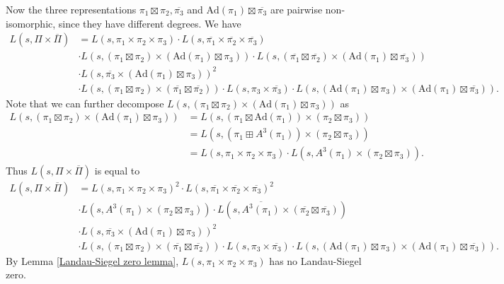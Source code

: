\documentclass[12pt]{amsart}
\newcommand{\Ad}{\text{Ad}}
\newcommand{\ov}{\overline}
\begin{document}
Now the three representations $\pi_1 \boxtimes \pi_2, \ov{\pi_3}$ and $\Ad(\pi_1) \boxtimes \ov{\pi_3}$ are pairwise non-isomorphic, since they have different degrees. We have
\begin{align*}
    L(s,\Pi \times \ov{\Pi}) &= L(s,\pi_1 \times \pi_2 \times \pi_3) \cdot L(s,\ov{\pi_1} \times \ov{\pi_2} \times \ov{\pi_3}) \\
    &\cdot L(s,(\pi_1 \boxtimes \pi_2) \times (\Ad(\pi_1) \boxtimes \pi_3)) \cdot L(s,(\ov{\pi_1} \boxtimes \ov{\pi_2}) \times (\Ad(\pi_1) \boxtimes \ov{\pi_3})) \\
    &\cdot L(s,\ov{\pi_3} \times (\Ad(\pi_1) \boxtimes \pi_3))^2 \\
    &\cdot L(s, (\pi_1 \boxtimes \pi_2) \times (\ov{\pi_1} \boxtimes \ov{\pi_2})) \cdot L(s,\pi_3 \times \ov{\pi_3}) \cdot L(s,(\Ad(\pi_1) \boxtimes \pi_3) \times (\Ad(\pi_1) \boxtimes \ov{\pi_3})).
\end{align*}
Note that we can further decompose $L(s,(\pi_1 \boxtimes \pi_2) \times (\Ad(\pi_1) \boxtimes \pi_3))$ as 
\begin{align*}
    L(s,(\pi_1 \boxtimes \pi_2) \times (\Ad(\pi_1) \boxtimes \pi_3)) &= L(s,(\pi_1 \boxtimes \Ad(\pi_1)) \times (\pi_2 \boxtimes \pi_3)) \\
    &= L(s,(\pi_1 \boxplus A^3(\pi_1)) \times (\pi_2 \boxtimes \pi_3)) \\
    &= L(s,\pi_1 \times \pi_2 \times \pi_3) \cdot L(s,A^3(\pi_1) \times (\pi_2 \boxtimes \pi_3)).
\end{align*}
Thus $L(s,\Pi \times \ov{\Pi})$ is equal to 
\begin{align*}
    L(s,\Pi \times \ov{\Pi}) &= L(s,\pi_1 \times \pi_2 \times \pi_3)^2 \cdot L(s,\ov{\pi_1} \times \ov{\pi_2} \times \ov{\pi_3})^2 \\
    &\cdot L(s,A^3(\pi_1) \times (\pi_2 \boxtimes \pi_3)) \cdot L(s,\ov{A^3(\pi_1)} \times (\ov{\pi_2} \boxtimes \ov{\pi_3})) \\
    &\cdot L(s,\ov{\pi_3} \times (\Ad(\pi_1) \boxtimes \pi_3))^2 \\
    &\cdot L(s, (\pi_1 \boxtimes \pi_2) \times (\ov{\pi_1} \boxtimes \ov{\pi_2})) \cdot L(s,\pi_3 \times \ov{\pi_3}) \cdot L(s,(\Ad(\pi_1) \boxtimes \pi_3) \times (\Ad(\pi_1) \boxtimes \ov{\pi_3})).
\end{align*}
By Lemma \ref{Landau-Siegel zero lemma}, $L(s,\pi_1 \times \pi_2 \times \pi_3)$ has no Landau-Siegel zero.
\end{document}
